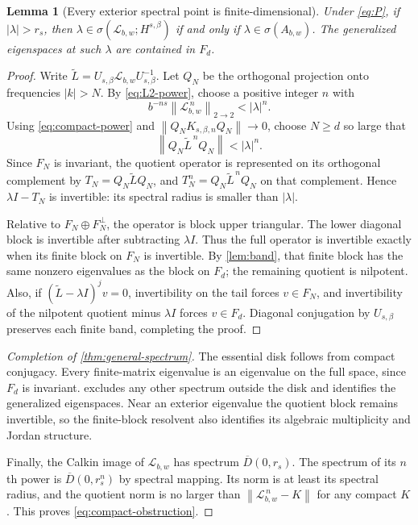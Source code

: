 \documentclass[11pt,a4paper]{article}
\newtheorem{lemma}[theorem]{Lemma}
\theoremstyle{definition}
\theoremstyle{remark}
\newcommand{\Lop}{\mathcal L}
\newcommand{\norm}[1]{\left\lVert#1\right\rVert}
\newcommand{\Disk}[1]{\overline{D}(0,#1)}
\numberwithin{equation}{section}
\begin{document}
\begin{lemma}[Every exterior spectral point is finite-dimensional]
\label{lem:outliers}
Under \eqref{eq:P}, if $|\lambda|>r_s$, then
$\lambda\in\sigma(\Lop_{b,w};H^{s,\beta})$ if and only if
$\lambda\in\sigma(A_{b,w})$. The generalized eigenspaces at such
$\lambda$ are contained in $F_d$.
\end{lemma}
\begin{proof}
Write $\widetilde L=U_{s,\beta}\Lop_{b,w}U_{s,\beta}^{-1}$.
Let $Q_N$ be the orthogonal projection onto frequencies $|k|>N$.
By \eqref{eq:L2-power}, choose a positive integer $n$ with
\[
 b^{-ns}\norm{\Lop_{b,w}^{\,n}}_{2\to2}<|\lambda|^n.
\]
Using \eqref{eq:compact-power} and
$\norm{Q_NK_{s,\beta,n}Q_N}\to0$, choose $N\ge d$ so large that
\begin{equation}
 \norm{Q_N\widetilde L^{\,n}Q_N}<|\lambda|^n.
 \label{eq:tail-power-bound}
\end{equation}
Since $F_N$ is invariant, the quotient operator is represented on its
orthogonal complement by $T_N=Q_N\widetilde LQ_N$, and
$T_N^n=Q_N\widetilde L^{\,n}Q_N$ on that complement. Hence
$\lambda I-T_N$ is invertible: its spectral radius is smaller than
$|\lambda|$.

Relative to $F_N\oplus F_N^\perp$, the operator is block upper triangular.
The lower diagonal block is invertible after subtracting $\lambda I$.
Thus the full operator is invertible exactly when its finite block on
$F_N$ is invertible. By \cref{lem:band}, that finite block has the same
nonzero eigenvalues as the block on $F_d$; the remaining quotient is
nilpotent. Also, if $(\widetilde L-\lambda I)^jv=0$, invertibility on the
tail forces $v\in F_N$, and invertibility of the nilpotent quotient minus
$\lambda I$ forces $v\in F_d$. Diagonal conjugation by $U_{s,\beta}$
preserves each finite band, completing the proof.
\end{proof}

\begin{proof}[Completion of \cref{thm:general-spectrum}]
The essential disk follows from compact conjugacy. Every finite-matrix
eigenvalue is an eigenvalue on the full space, since $F_d$ is invariant.
 excludes any other spectrum outside the disk and
identifies the generalized eigenspaces. Near an exterior eigenvalue the
quotient block remains invertible, so the finite-block resolvent also
identifies its algebraic multiplicity and Jordan structure.

Finally, the Calkin image of $\Lop_{b,w}$ has spectrum $\Disk{r_s}$.
The spectrum of its $n$th power is $\Disk{r_s^n}$ by spectral mapping.
Its norm is at least its spectral radius, and the quotient norm is no
larger than $\norm{\Lop_{b,w}^{\,n}-K}$ for any compact $K$.
This proves \eqref{eq:compact-obstruction}.
\end{proof}
\end{document}
